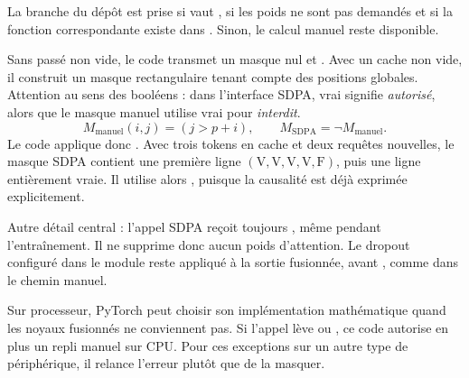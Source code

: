 

La branche du dépôt est prise si  vaut , si les poids ne sont pas demandés et si la fonction correspondante existe dans . Sinon, le calcul manuel reste disponible.

Sans passé non vide, le code transmet un masque nul et . Avec un cache non vide, il construit un masque rectangulaire tenant compte des positions globales. Attention au sens des booléens : dans l'interface SDPA, vrai signifie \emph{autorisé}, alors que le masque manuel utilise vrai pour \emph{interdit}.
\[
 M_{\mathrm{manuel}}(i,j)=(j>p+i),\qquad
 M_{\mathrm{SDPA}}=\neg M_{\mathrm{manuel}}.
\]
Le code applique donc . Avec trois tokens en cache et deux requêtes nouvelles, le masque SDPA contient une première ligne $(\mathrm{V},\mathrm{V},\mathrm{V},\mathrm{V},\mathrm{F})$, puis une ligne entièrement vraie. Il utilise alors , puisque la causalité est déjà exprimée explicitement.

Autre détail central : l'appel SDPA reçoit toujours , même pendant l'entraînement. Il ne supprime donc aucun poids d'attention. Le dropout configuré dans le module reste appliqué à la sortie fusionnée, avant , comme dans le chemin manuel.

Sur processeur, PyTorch peut choisir son implémentation mathématique quand les noyaux fusionnés ne conviennent pas. Si l'appel lève  ou , ce code autorise en plus un repli manuel sur CPU. Pour ces exceptions sur un autre type de périphérique, il relance l'erreur plutôt que de la masquer.


